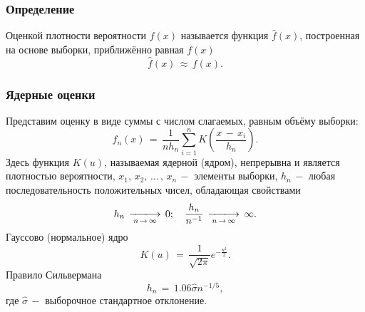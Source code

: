 \subsubsection{Определение}
\begin{flushleft}
	Оценкой плотности вероятности $f(x)$ называется функция $\hat{f}(x)$, построенная на основе выборки, приближённо равная $f(x)$
	\begin{equation}
		\label{22} \hat{f}(x)\,\approx\, f(x).
	\end{equation}
\end{flushleft}

\subsubsection{Ядерные оценки}
\begin{flushleft}
	Представим оценку в виде суммы с числом слагаемых, равным объёму выборки:
	\begin{equation}
		\label{23} \hat{f}_n(x)\,=\,\frac{1}{nh_n}\displaystyle\sum_{i=1}^{n} K\left(\frac{x \,-\, x_i}{h_n}\right).
	\end{equation}
	Здесь функция $K(u)$, называемая ядерной (ядром), непрерывна и является плотностью вероятности, $x_1,\, x_2,\,...\,,\, x_n \,-$ элементы выборки, ${h_n}\,-$ любая последовательность положительных чисел, обладающая свойствами
	\begin{equation}
		\label{24} h_n \,\xlongrightarrow[n \,\rightarrow\,\infty]{}\,0;\quad \frac{h_n}{n^{-1}}\,\xlongrightarrow[n \,\rightarrow\,\infty]{}\,\infty.
	\end{equation}
	Гауссово (нормальное) ядро \cite[с.38]{4}
	\begin{equation}
		\label{25} K(u)\,=\,\frac{1}{\sqrt{2\pi}}e^{-\frac{u^2}{2}}.
	\end{equation}
	Правило Сильвермана \cite[с.44]{4}
	\begin{equation}
		\label{26} h_n \,=\,1.06\hat{\sigma}n^{-1/5},
	\end{equation}
	где $\hat{\sigma}\,-$ выборочное стандартное отклонение.
\end{flushleft}